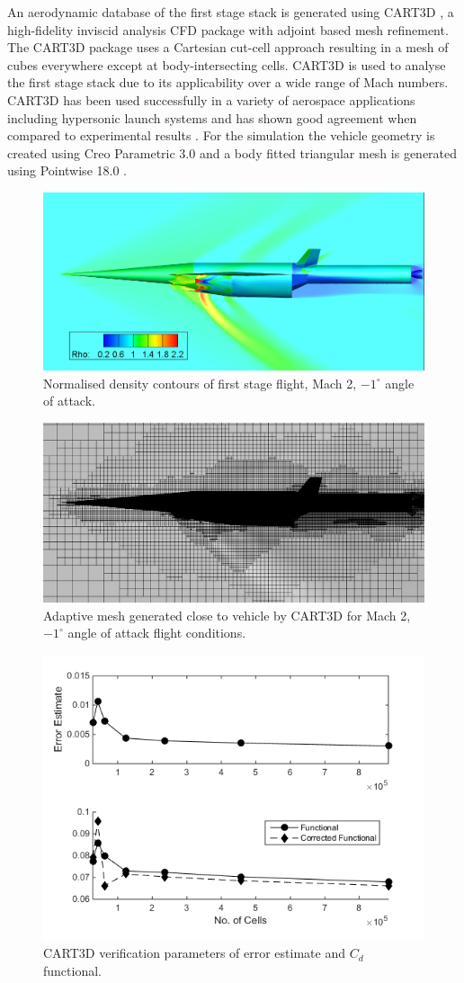 \documentclass[]{aiaa-tc}
\begin{document}
An aerodynamic database of the first stage stack is generated using CART3D \cite{CART3D}, a high-fidelity inviscid analysis CFD package with adjoint based mesh refinement. The CART3D package uses a Cartesian cut-cell approach \cite{Aftosmis1997} resulting in a mesh of cubes everywhere except at body-intersecting cells. CART3D is used to analyse the first stage stack due to its applicability over a wide range of Mach numbers. CART3D has been used successfully in a variety of aerospace applications including hypersonic launch systems \cite{Mehta2015} and has shown good agreement when compared to experimental results \cite{Aftosmis2011}.
For the simulation the vehicle geometry is created using Creo Parametric 3.0 \cite{CREO} and a body fitted triangular mesh is generated using Pointwise 18.0 \cite{Pointwise}.
\begin{figure}[ht]
	\centering
	\includegraphics[width=0.6\linewidth]{CARTcontour}
	\caption{Normalised density contours of first stage flight, Mach 2, $-1^\circ$ angle of attack.}
	\label{fig:CARTcontour}
\end{figure}
\begin{figure}[ht]
	\centering
	\includegraphics[width=0.6\linewidth]{CARTmesh}
	\caption{Adaptive mesh generated close to vehicle by CART3D for Mach 2, $-1^\circ$ angle of attack flight conditions.}
	\label{fig:CARTmesh}
\end{figure}
\begin{figure}[ht]
	\centering
	\includegraphics[width=0.4\linewidth]{CART}
	\caption{CART3D verification parameters of error estimate and $C_d$ functional.}
	\label{fig:CART}
\end{figure}
\end{document}
